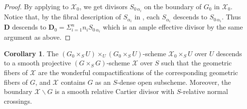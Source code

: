 \documentclass[11pt, reqno]{amsart}
\theoremstyle{plain}
\theoremstyle{definition}
\newtheorem{corollary}[theorem]{Corollary}
\begin{document}
\begin{proof}
By applying  to $\mathcal{X}_0$, we get divisors $S_{0\,\alpha_i}$ on the boundary of $G_0$ in $\mathcal{X}_0$.
Notice that, by the fibral description of $S_{\alpha_i}$ in , each $S_{\alpha_i}$ descends to $S_{0\,\alpha_i}$. Thus $\mathbf{D}$ descends to $\mathbf{D}_0=\Sigma_{i=1}^n n_iS_{0\,\alpha_i}$ which is an ample effective divisor by the same argument as above.
\end{proof}

\begin{corollary}\label{solutiontoconjecadjoint}
    The $(G_0\times_S U)\times_U(G_0\times_S U)$-scheme $\mathcal{X}_0 \times_S U$ over $U$ descends to a smooth projective $(G\times_S G)$-scheme $\mathcal{X}$ over $S$ such that  the geometric fibers of $\mathcal{X}$ are the wonderful compactifications of the corresponding geometric fibers of $G$, and $\mathcal{X}$ contains $G$ as an $S$-dense open subscheme. Moreover, the boundary $\mathcal{X}\backslash G$ is a smooth relative Cartier divisor with $S$-relative normal crossings.
\end{corollary} 
\end{document}
